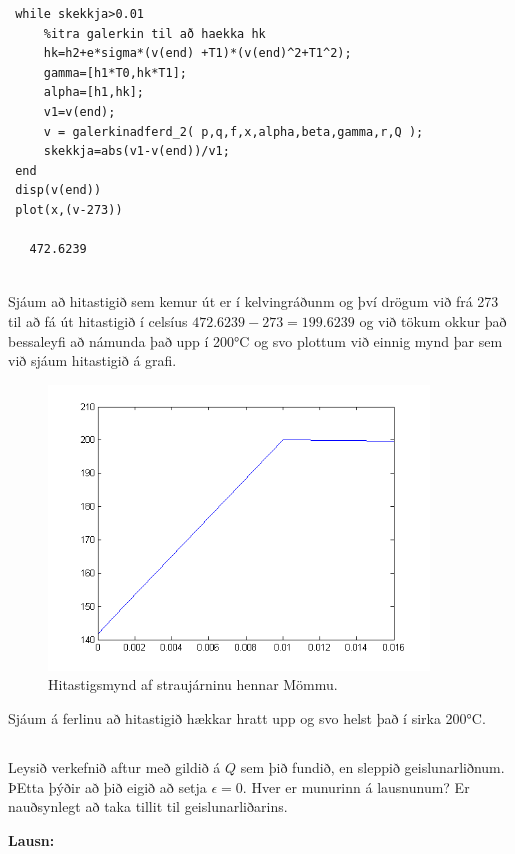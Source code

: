 \documentclass[11pt,a4paper,titlepage]{article}
\begin{document}
 \begin{verbatim}
 while skekkja>0.01
     %itra galerkin til að haekka hk
     hk=h2+e*sigma*(v(end) +T1)*(v(end)^2+T1^2);
     gamma=[h1*T0,hk*T1];
     alpha=[h1,hk];
     v1=v(end);
     v = galerkinadferd_2( p,q,f,x,alpha,beta,gamma,r,Q );
     skekkja=abs(v1-v(end))/v1;
 end
 disp(v(end))
 plot(x,(v-273))
 
   472.6239
 
 \end{verbatim}
 Sjáum að hitastigið sem kemur út er í kelvingráðunm og því drögum við frá 273 til að fá út hitastigið í celsíus $472.6239-273=199.6239$ og við tökum okkur það bessaleyfi að námunda það upp í 200°C og svo plottum við einnig mynd þar sem við sjáum hitastigið á grafi. 
 \begin{figure}[h!]
      \centering
      \includegraphics[width=0.9\textwidth]{2_2_e_0_2.png}
      \caption{Hitastigsmynd af straujárninu hennar Mömmu.}
      \label{fig:awesome_image3}
  \end{figure}
  
  Sjáum á ferlinu að hitastigið hækkar hratt upp og svo helst það í sirka 200°C.
\subsection{}
Leysið verkefnið aftur með gildið á $Q$ sem þið fundið, en sleppið geislunarliðnum.  ÞEtta þýðir að þið eigið að setja $\epsilon = 0$. Hver er munurinn á lausnunum? Er nauðsynlegt að taka tillit til geislunarliðarins.  

\par
\textbf{Lausn:}\par
\end{document}
